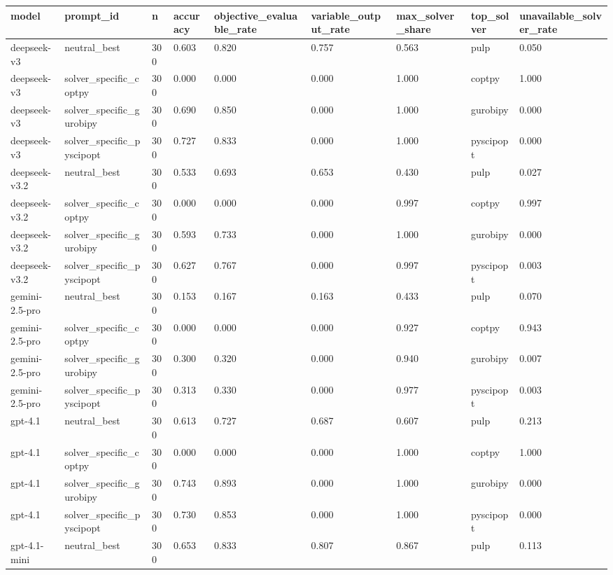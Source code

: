 \begin{table}[t]
\centering
\small
\begin{tabular}{lllllllll}
\toprule
model & prompt\_id & n & accuracy & objective\_evaluable\_rate & variable\_output\_rate & max\_solver\_share & top\_solver & unavailable\_solver\_rate \\
\midrule
deepseek-v3 & neutral\_best & 300 & 0.603 & 0.820 & 0.757 & 0.563 & pulp & 0.050 \\
deepseek-v3 & solver\_specific\_coptpy & 300 & 0.000 & 0.000 & 0.000 & 1.000 & coptpy & 1.000 \\
deepseek-v3 & solver\_specific\_gurobipy & 300 & 0.690 & 0.850 & 0.000 & 1.000 & gurobipy & 0.000 \\
deepseek-v3 & solver\_specific\_pyscipopt & 300 & 0.727 & 0.833 & 0.000 & 1.000 & pyscipopt & 0.000 \\
deepseek-v3.2 & neutral\_best & 300 & 0.533 & 0.693 & 0.653 & 0.430 & pulp & 0.027 \\
deepseek-v3.2 & solver\_specific\_coptpy & 300 & 0.000 & 0.000 & 0.000 & 0.997 & coptpy & 0.997 \\
deepseek-v3.2 & solver\_specific\_gurobipy & 300 & 0.593 & 0.733 & 0.000 & 1.000 & gurobipy & 0.000 \\
deepseek-v3.2 & solver\_specific\_pyscipopt & 300 & 0.627 & 0.767 & 0.000 & 0.997 & pyscipopt & 0.003 \\
gemini-2.5-pro & neutral\_best & 300 & 0.153 & 0.167 & 0.163 & 0.433 & pulp & 0.070 \\
gemini-2.5-pro & solver\_specific\_coptpy & 300 & 0.000 & 0.000 & 0.000 & 0.927 & coptpy & 0.943 \\
gemini-2.5-pro & solver\_specific\_gurobipy & 300 & 0.300 & 0.320 & 0.000 & 0.940 & gurobipy & 0.007 \\
gemini-2.5-pro & solver\_specific\_pyscipopt & 300 & 0.313 & 0.330 & 0.000 & 0.977 & pyscipopt & 0.003 \\
gpt-4.1 & neutral\_best & 300 & 0.613 & 0.727 & 0.687 & 0.607 & pulp & 0.213 \\
gpt-4.1 & solver\_specific\_coptpy & 300 & 0.000 & 0.000 & 0.000 & 1.000 & coptpy & 1.000 \\
gpt-4.1 & solver\_specific\_gurobipy & 300 & 0.743 & 0.893 & 0.000 & 1.000 & gurobipy & 0.000 \\
gpt-4.1 & solver\_specific\_pyscipopt & 300 & 0.730 & 0.853 & 0.000 & 1.000 & pyscipopt & 0.000 \\
gpt-4.1-mini & neutral\_best & 300 & 0.653 & 0.833 & 0.807 & 0.867 & pulp & 0.113 \\

\end{tabular}
\end{table}
